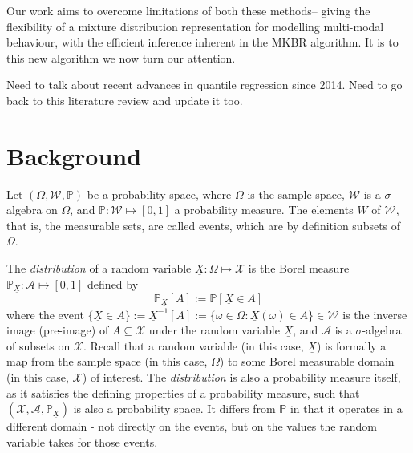 \documentclass[twoside]{article} \usepackage{aistats2017}
\newcommand{\rv}[1]{\underline{#1}}
\newcommand{\warn}[1]{{\color{RedOrange} #1}}
\newcommand{\extra}[1]{{\color{ForestGreen} #1}}
\begin{document}


	Our work aims to overcome limitations of both these methods-- giving the flexibility of a mixture distribution representation for modelling multi-modal behaviour, with the efficient inference inherent in the MKBR algorithm. It is to this new algorithm we now turn our attention.

	\warn{Need to talk about recent advances in quantile regression since 2014. Need to go back to this literature review and update it too.}
	
\section{Background}
	
		Let $(\Omega, \mathcal{W}, \mathbb{P})$ be a probability space, where $\Omega$ is the sample space, $\mathcal{W}$ is a $\sigma$-algebra on $\Omega$, and $\mathbb{P} : \mathcal{W} \mapsto [0, 1]$ a probability measure. The elements $W$ of $\mathcal{W}$, that is, the measurable sets, are called events, which are by definition subsets of $\Omega$.
		
		The \textit{distribution} of a random variable $\rv{X} : \Omega \mapsto \mathcal{X}$ is the Borel measure $\mathbb{P}_{\rv{X}} : \mathcal{A} \mapsto [0, 1]$ defined by
		\begin{equation}
			\mathbb{P}_{\rv{X}}[A] := \mathbb{P}[\rv{X} \in A]
		\label{eq:distribution}
		\end{equation}
		where the event $\{\rv{X} \in A\} := \rv{X}^{-1}[A] := \{\omega \in \Omega : \rv{X}(\omega) \in A\} \in \mathcal{W}$ is the inverse image (pre-image) of $A \subseteq \mathcal{X}$ under the random variable $\rv{X}$, and $\mathcal{A}$ is a $\sigma$-algebra of subsets on $\mathcal{X}$. \extra{Recall that a random variable (in this case, $\rv{X}$) is formally a map from the sample space (in this case, $\Omega$) to some Borel measurable domain (in this case, $\mathcal{X}$) of interest. The \textit{distribution} is also a probability measure itself, as it satisfies the defining properties of a probability measure, such that $(\mathcal{X}, \mathcal{A}, \mathbb{P}_{\rv{X}})$ is also a probability space. It differs from $\mathbb{P}$ in that it operates in a different domain - not directly on the events, but on the values the random variable takes for those events.}
		
\end{document}
